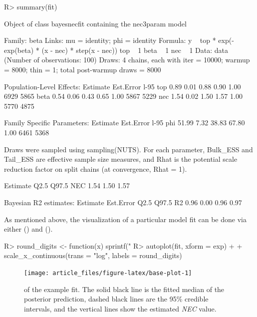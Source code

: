\documentclass[
  shortnames]{jss}
\begin{document}
\begin{CodeChunk}
\begin{CodeInput}
R> summary(fit)
\end{CodeInput}
\begin{CodeOutput}
Object of class bayesnecfit containing the nec3param model

 Family: beta 
  Links: mu = identity; phi = identity 
Formula: y ~ top * exp(-exp(beta) * (x - nec) * step(x - nec)) 
         top ~ 1
         beta ~ 1
         nec ~ 1
   Data: data (Number of observations: 100) 
  Draws: 4 chains, each with iter = 10000; warmup = 8000; thin = 1;
         total post-warmup draws = 8000

Population-Level Effects: 
     Estimate Est.Error l-95%
top      0.89      0.01     0.88     0.90 1.00     6929     5865
beta     0.54      0.06     0.43     0.65 1.00     5867     5229
nec      1.54      0.02     1.50     1.57 1.00     5770     4875

Family Specific Parameters: 
    Estimate Est.Error l-95%
phi    51.99      7.32    38.83    67.80 1.00     6461     5368

Draws were sampled using sampling(NUTS). For each parameter, Bulk_ESS
and Tail_ESS are effective sample size measures, and Rhat is the potential
scale reduction factor on split chains (at convergence, Rhat = 1).


    Estimate Q2.5 Q97.5
NEC     1.54 1.50  1.57


Bayesian R2 estimates:
   Estimate Est.Error Q2.5 Q97.5
R2     0.96      0.00 0.96  0.97
\end{CodeOutput}
\end{CodeChunk}

As mentioned above, the visualization of a particular model fit can be done via either   () and  \citep{ggplot} ().

\begin{CodeChunk}
\begin{CodeInput}
R> round_digits <- function(x) sprintf("%
R> autoplot(fit, xform = exp) +
+   scale_x_continuous(trans = "log", labels = round_digits)
\end{CodeInput}
\begin{figure}[!ht]

{\centering \texttt{[image: article\_files/figure-latex/base-plot-1]} 

}

\caption{  of the example fit. The solid black line is the fitted median of the posterior prediction, dashed black lines are the 95\% credible intervals, and the vertical lines show the estimated \textit{NEC} value.}\label{fig:base-plot}
\end{figure}
\end{CodeChunk}
\end{document}
